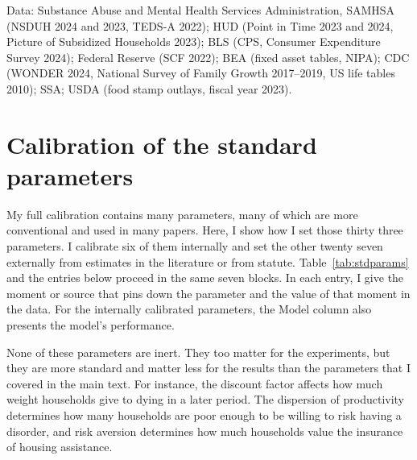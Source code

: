 \documentclass[10pt]{article}
\begin{document}
{\noindent Data: Substance Abuse and Mental Health Services Administration, SAMHSA (NSDUH 2024 and 2023, TEDS-A 2022); HUD (Point in Time 2023 and 2024, Picture of Subsidized Households 2023); BLS (CPS, Consumer Expenditure Survey 2024); Federal Reserve (SCF 2022); BEA (fixed asset tables, NIPA); CDC (WONDER 2024, National Survey of Family Growth 2017--2019, US life tables 2010); SSA; USDA (food stamp outlays, fiscal year 2023).\par}

\clearpage
\appendix

\setcounter{table}{0}
\section[Calibration of the standard parameters]{Calibration of the standard parameters}\label{sec:stdparams}

  My full calibration contains many parameters, many of which are more conventional and used in many papers. Here, I show how I set those thirty three parameters. I calibrate six of them internally and set the other twenty seven externally from estimates in the literature or from statute. Table~\ref{tab:stdparams} and the entries below proceed in the same seven blocks. In each entry, I give the moment or source that pins down the parameter and the value of that moment in the data. For the internally calibrated parameters, the Model column also presents the model's performance.

 None of these parameters are inert. They too matter for the experiments, but they are more standard and matter less for the results than the parameters that I covered in the main text. For instance, the discount factor affects how much weight households give to dying in a later period. The dispersion of productivity determines how many households are poor enough to be willing to risk having a disorder, and risk aversion determines how much households value the insurance of housing assistance.


\end{document}
